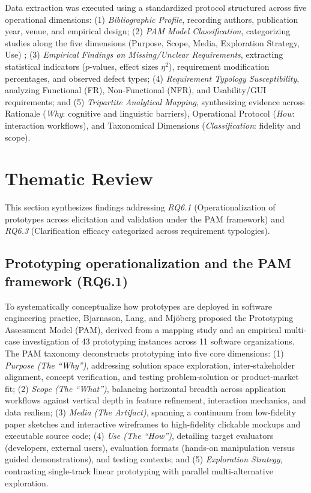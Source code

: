 \documentclass[conference]{IEEEtran}
\begin{document}
Data extraction was executed using a standardized protocol structured across five operational dimensions: (1) \textit{Bibliographic Profile}, recording authors, publication year, venue, and empirical design; (2) \textit{PAM Model Classification}, categorizing studies along the five dimensions (Purpose, Scope, Media, Exploration Strategy, Use) \cite{bjarnason2023empirically}; (3) \textit{Empirical Findings on Missing/Unclear Requirements}, extracting statistical indicators ($p$-values, effect sizes $\eta^2$), requirement modification percentages, and observed defect types; (4) \textit{Requirement Typology Susceptibility}, analyzing Functional (FR), Non-Functional (NFR), and Usability/GUI requirements; and (5) \textit{Tripartite Analytical Mapping}, synthesizing evidence across Rationale (\textit{Why}: cognitive and linguistic barriers), Operational Protocol (\textit{How}: interaction workflows), and Taxonomical Dimensions (\textit{Classification}: fidelity and scope).

\section{Thematic Review}
\label{sec:thematic}

This section synthesizes findings addressing \textit{RQ6.1} (Operationalization of prototypes across elicitation and validation under the PAM framework) and \textit{RQ6.3} (Clarification efficacy categorized across requirement typologies).

\subsection{Prototyping operationalization and the PAM framework (RQ6.1)}
To systematically conceptualize how prototypes are deployed in software engineering practice, Bjarnason, Lang, and Mj{\"o}berg \cite{bjarnason2023empirically} proposed the Prototyping Assessment Model (PAM), derived from a mapping study and an empirical multi-case investigation of 43 prototyping instances across 11 software organizations. The PAM taxonomy deconstructs prototyping into five core dimensions: (1) \textit{Purpose (The ``Why'')}, addressing solution space exploration, inter-stakeholder alignment, concept verification, and testing problem-solution or product-market fit; (2) \textit{Scope (The ``What'')}, balancing horizontal breadth across application workflows against vertical depth in feature refinement, interaction mechanics, and data realism; (3) \textit{Media (The Artifact)}, spanning a continuum from low-fidelity paper sketches and interactive wireframes to high-fidelity clickable mockups and executable source code; (4) \textit{Use (The ``How'')}, detailing target evaluators (developers, external users), evaluation formats (hands-on manipulation versus guided demonstrations), and testing contexts; and (5) \textit{Exploration Strategy}, contrasting single-track linear prototyping with parallel multi-alternative exploration.
\end{document}
